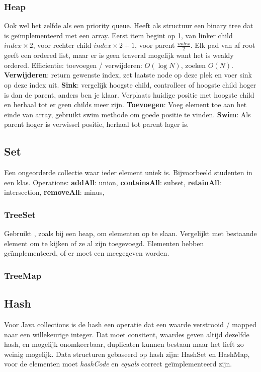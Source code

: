 \subsubsection{Heap}
Ook wel het zelfde als een priority queue.
Heeft als structuur een binary tree dat is geïmplementeerd met een array.
Eerst item begint op 1, van linker child $index \times 2$, voor rechter child $index \times 2 + 1$, voor parent $\frac{index}{2}$.
Elk pad van af root geeft een ordered list, maar er is geen traveral mogelijk want het is weakly ordered.
Efficientie: toevoegen / verwijderen: $O(\log N)$, zoeken $O(N)$.
\textbf{Verwijderen}: return gewenste index, zet laatste node op deze plek en voer sink op deze index uit.
\textbf{Sink}: vergelijk hoogste child, controlleer of hoogste child hoger is dan de parent, anders ben je klaar.
Verplaats huidige positie met hoogste child en herhaal tot er geen childs meer zijn.
\textbf{Toevoegen}: Voeg element toe aan het einde van array, gebruikt swim methode om goede positie te vinden.
\textbf{Swim}: Als parent hoger is verwissel positie, herhaal tot parent lager is.

\subsection{Set}
Een ongeorderde collectie waar ieder element uniek is.
Bijvoorbeeld studenten in een klas.
Operations:
\textbf{addAll}: union,
\textbf{containsAll}: subset,
\textbf{retainAll}: intersection,
\textbf{removeAll}: minus,

\subsubsection{TreeSet}
Gebruikt , zoals bij een heap, om elementen op te slaan.
Vergelijkt met bestaande element om te kijken of ze al zijn toegevoegd.
Elementen hebben  geïmplementeerd, of er moet een  meegegeven worden.

\subsubsection{TreeMap}

\subsection{Hash}
Voor Java collections is de hash een operatie dat een waarde verstrooid / mapped naar een willekeurige integer.
Dat moet consitent, waardes geven altijd dezelfde hash, en mogelijk onomkeerbaar, duplicaten kunnen bestaan maar het lieft zo weinig mogelijk.
Data structuren gebaseerd op hash zijn: HashSet en HashMap, voor de elementen moet \textit{hashCode} en \textit{equals} correct geïmplementeerd zijn.

